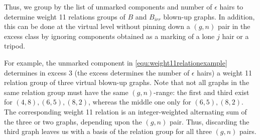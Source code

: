 Thus, we group by the list of unmarked components and number of $\epsilon$ hairs to determine weight 11 relations groups of $B$ and $B_{irr}$ blown-up graphs.
In addition, this can be done at the virtual level without pinning down a $(g,n)$ pair in the excess class by ignoring components obtained as a marking of a lone $j$ hair or a tripod.

For example, the unmarked component in \ref{equ:weight11relationexample} determines in excess 3 (the excess determines the number of $\epsilon$ hairs) a weight 11 relation group of three virtual blown-up graphs. Note that not all graphs in the same relation group must have the same $(g,n)$-range: the first and third exist for $(4,8),(6,5),(8,2)$, whereas the middle one only for $(6,5),(8,2)$.
The corresponding weight 11 relation is an integer-weighted alternating sum of the three or two graphs, depending upon the $(g,n)$ pair. Thus, discarding the third graph leaves us with a basis of the relation group for all three $(g,n)$ pairs.
